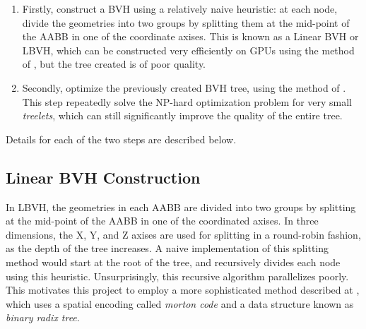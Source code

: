 \begin{enumerate}
    \item Firstly, construct a BVH using a relatively naive heuristic: at each node, divide the geometries into two groups by splitting them at the mid-point of the AABB in one of the coordinate axises. This is known as a Linear BVH or LBVH, which can be constructed very efficiently on GPUs using the method of \cite{bvh_build}, but the tree created is of poor quality.
    \item Secondly, optimize the previously created BVH tree, using the method of \cite{bvh_optimize}. This step repeatedly solve the NP-hard optimization problem for very small \textit{treelets}, which can still significantly improve the quality of the entire tree.
\end{enumerate}
Details for each of the two steps are described below.

\subsection{Linear BVH Construction}
In LBVH, the geometries in each AABB are divided into two groups by splitting at the mid-point of the AABB in one of the coordinated axises. In three dimensions, the X, Y, and Z axises are used for splitting in a round-robin fashion, as the depth of the tree increases. A naive implementation of this splitting method would start at the root of the tree, and recursively divides each node using this heuristic. Unsurprisingly, this recursive algorithm parallelizes poorly. This motivates this project to employ a more sophisticated method described at \cite{bvh_build}, which uses a spatial encoding called \textit{morton code} and a data structure known as \textit{binary radix tree}.

